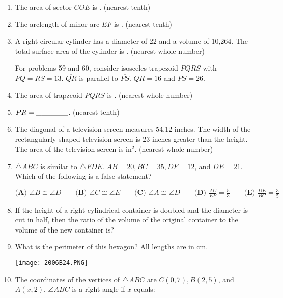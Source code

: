 \documentclass[../uilmath.tex]{subfiles}
\begin{document}
\begin{enumerate}[label=\bfseries\arabic*.]
    \item %
    The area of sector $COE$ is \blank. (nearest tenth)

    \item %
    The arclength of minor arc $EF$ is \blank. (nearest tenth)

    \item %
    A right circular cylinder has a diameter of 22 and a volume of 10,264. The total surface area of the cylinder is \blank. (nearest whole number)


    For problems 59 and 60, consider isosceles trapezoid $PQRS$ with $PQ=RS=13$. $\overline{QR}$ is parallel to $\overline{PS}$. $QR=16$ and $PS=26$.
    \item %
    The area of trapzeoid $PQRS$ is \blank. (nearest whole number)

    \item %
    $PR=\_\_\_\_\_\_$. (nearest tenth)

    \item %
    The diagonal of a television screen measures 54.12 inches. The width of the rectangularly shaped 
    television screen is 23 inches greater than the height. The area of the television screen is \blank in$^2$. (nearest whole number)

    \item %
    $\triangle ABC$ is similar to $\triangle FDE$. $AB=20, BC=35, DF=12$, and $DE=21$. Which of the following is a false statement?

    $\textbf{(A) } \angle B \cong \angle D \qquad \textbf{(B) } \angle C \cong \angle E \qquad \textbf{(C) } \angle A \cong \angle D \qquad \textbf{(D) } \frac{AC}{EF}=\frac{5}{3} \qquad \textbf{(E) } \frac{DE}{BC}=\frac{3}{5}$

    \item %
    If the height of a right cylindrical container is doubled and the diameter is cut in half, then 
    the ratio of the volume of the original container to the volume of the new container is? 

    \item %
    What is the perimeter of this hexagon? All lengths are in cm.
    \begin{center}
        \texttt{[image: 2006B24.PNG]}
    \end{center}

    \item %
    The coordinates of the vertices of $\triangle ABC$ are $C(0,7), B(2,5)$, and $A(x,2)$. 
    $\angle ABC$ is a right angle if $x$ equals:


\end{enumerate}
\end{document}
